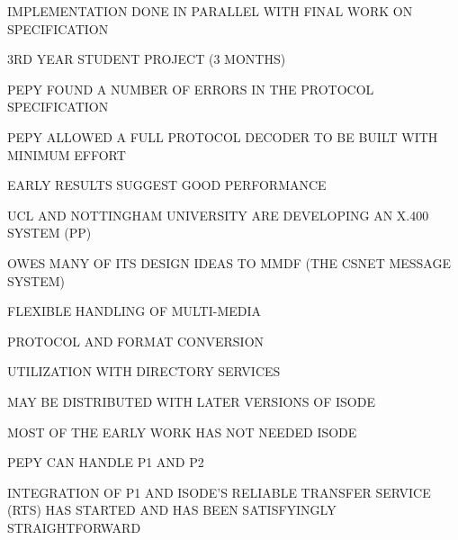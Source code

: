 \begin{bwslide}

\begin{nrtc}
\item	IMPLEMENTATION DONE IN PARALLEL WITH FINAL WORK ON SPECIFICATION

\item	3RD YEAR STUDENT PROJECT (3 MONTHS)

\item	PEPY FOUND A NUMBER OF ERRORS IN THE PROTOCOL SPECIFICATION

\item	PEPY ALLOWED A FULL PROTOCOL DECODER TO BE BUILT WITH MINIMUM EFFORT

\item	EARLY RESULTS SUGGEST GOOD PERFORMANCE
\end{nrtc}
\end{bwslide}


\begin{bwslide}

\begin{nrtc}
\item	UCL AND NOTTINGHAM UNIVERSITY ARE DEVELOPING AN X.400 SYSTEM (PP)

\item	OWES MANY OF ITS DESIGN IDEAS TO MMDF (THE CSNET MESSAGE SYSTEM)

\item	FLEXIBLE HANDLING OF MULTI-MEDIA

\item	PROTOCOL AND FORMAT CONVERSION

\item	UTILIZATION WITH DIRECTORY SERVICES

\item	MAY BE DISTRIBUTED WITH LATER VERSIONS OF ISODE
\end{nrtc}
\end{bwslide}


\begin{bwslide}

\begin{nrtc}
\item	MOST OF THE EARLY WORK HAS NOT NEEDED ISODE

\item	PEPY CAN HANDLE P1 AND P2

\item	INTEGRATION OF P1 AND ISODE'S RELIABLE TRANSFER SERVICE (RTS) HAS
	STARTED AND HAS BEEN SATISFYINGLY STRAIGHTFORWARD
\end{nrtc}
\end{bwslide}


